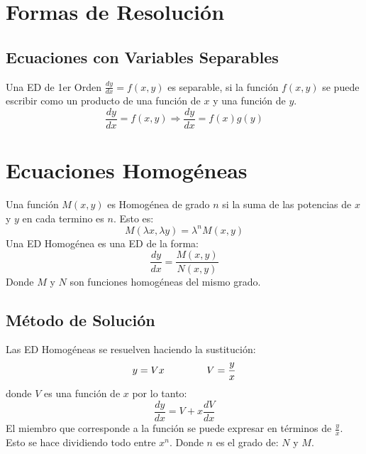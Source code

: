 \section{Formas de Resolución}
\subsection{Ecuaciones con Variables Separables}
Una ED de 1er Orden $\frac{dy}{dx}=f(x,y)$ es separable, si la función $f(x,y)$ se puede escribir como un producto de una función de $x$ y una función de $y$.
$$\dfrac{dy}{dx}=f(x,y)\Rightarrow \dfrac{dy}{dx}=f(x)g(y)$$
\section{Ecuaciones Homogéneas}
Una función $M(x,y)$ es Homogénea de grado $n$ si la suma de las potencias de $x$ y $y$ en cada termino es $n$. Esto es:
$$M(\lambda x,\lambda y)=\lambda^nM(x,y)$$
Una ED Homogénea es una ED de la forma:
$$\dfrac{dy}{dx}=\dfrac{M(x,y)}{N(x,y)}$$
Donde $M$ y $N$ son funciones homogéneas del mismo grado.
\subsection{Método de Solución}
Las ED Homogéneas se resuelven haciendo la sustitución:
$$y=Vx \hspace{1.5cm} V=\dfrac{y}{x}$$
donde $V$ es una función de $x$ por lo tanto:
$$\dfrac{dy}{dx}=V+x\dfrac{dV}{dx}$$
El miembro que corresponde a la función se puede expresar en términos de $\frac{y}{x}$. Esto se hace dividiendo todo entre $x^n$. Donde $n$ es el grado de: $N$ y $M$.

